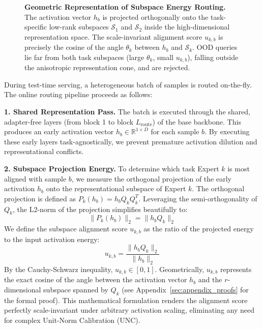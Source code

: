 \begin{figure}[t]
\begin{tikzpicture}[scale=2.0, >=stealth]
  \end{tikzpicture}
  \caption{\textbf{Geometric Representation of Subspace Energy Routing.} The activation vector $h_b$ is projected orthogonally onto the task-specific low-rank subspaces $\mathcal{S}_1$ and $\mathcal{S}_2$ inside the high-dimensional representation space. The scale-invariant alignment score $u_{k,b}$ is precisely the cosine of the angle $\theta_k$ between $h_b$ and $\mathcal{S}_k$. OOD queries lie far from both task subspaces (large $\theta_k$, small $u_{k,b}$), falling outside the anisotropic representation cone, and are rejected.}
  \label{fig:geometric_routing}
\end{figure}

During test-time serving, a heterogeneous batch of samples is routed on-the-fly. The online routing pipeline proceeds as follows:

\textbf{1. Shared Representation Pass.} The batch is executed through the shared, adapter-free layers (from block 1 to block $L_{\text{route}}$) of the base backbone. This produces an early activation vector $h_b \in \mathbb{R}^{1 \times D}$ for each sample $b$. By executing these early layers task-agnostically, we prevent premature activation dilution and representational conflicts.

\textbf{2. Subspace Projection Energy.} To determine which task Expert $k$ is most aligned with sample $b$, we measure the orthogonal projection of the early activation $h_b$ onto the representational subspace of Expert $k$. The orthogonal projection is defined as $P_k(h_b) = h_b Q_k Q_k^T$. Leveraging the semi-orthogonality of $Q_k$, the L2-norm of the projection simplifies beautifully to:
\begin{equation}
    \| P_k(h_b) \|_2 = \| h_b Q_k \|_2
\end{equation}
We define the subspace alignment score $u_{k, b}$ as the ratio of the projected energy to the input activation energy:
\begin{equation}
    u_{k, b} = \frac{\parallel h_b Q_k \parallel_2}{\parallel h_b \parallel_2}
\end{equation}
By the Cauchy-Schwarz inequality, $u_{k, b} \in [0, 1]$. Geometrically, $u_{k, b}$ represents the exact cosine of the angle between the activation vector $h_b$ and the $r$-dimensional subspace spanned by $Q_k$ (see Appendix~\ref{sec:appendix_proofs} for the formal proof). This mathematical formulation renders the alignment score perfectly scale-invariant under arbitrary activation scaling, eliminating any need for complex Unit-Norm Calibration (UNC).

